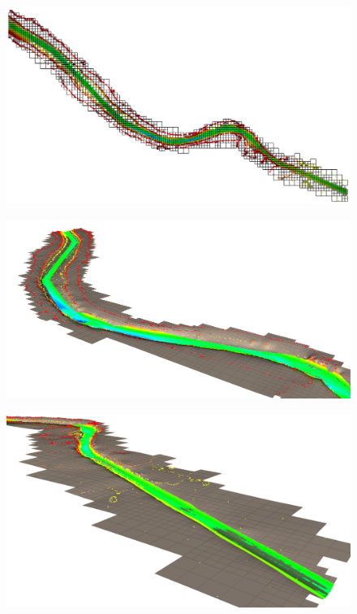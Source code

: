 \documentclass[A4paper,11pt]{marine_2023_Paper}
\begin{document}
\begin{figure}
	\centering
	\includegraphics[width=1.0\linewidth]{"Screenshot from 2023-04-17 20-43-40"}
	\caption{}
	\label{fig:screenshot-from-2023-04-17-20-43-40}
\end{figure}

\begin{figure}
	\centering
	\includegraphics[width=0.7\linewidth]{"Screenshot from 2023-04-17 21-43-39"}
	\caption{}
	\label{fig:screenshot-from-2023-04-17-21-43-39}
\end{figure}

\begin{figure}
	\centering
	\includegraphics[width=0.7\linewidth]{"Screenshot from 2023-04-17 21-41-58"}
	\caption{}
	\label{fig:screenshot-from-2023-04-17-21-41-58}
\end{figure}
\end{document}
